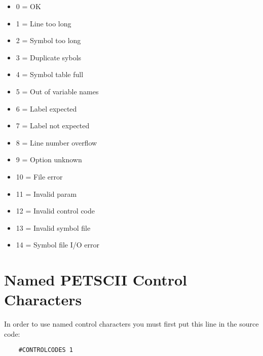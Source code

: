 \documentclass{article}
\begin{document}
        \begin{itemize}
            \item 0 = OK
            \item 1 = Line too long
            \item 2 = Symbol too long
            \item 3 = Duplicate sybols
            \item 4 = Symbol table full
            \item 5 = Out of variable names
            \item 6 = Label expected
            \item 7 = Label not expected
            \item 8 = Line number overflow
            \item 9 = Option unknown
            \item 10 = File error
            \item 11 = Invalid param
            \item 12 = Invalid control code
            \item 13 = Invalid symbol file
            \item 14 = Symbol file I/O error
        \end{itemize}

\appendix
\newpage
\section{Named PETSCII Control Characters}
    
    In order to use named control characters you must first
    put this line in the source code:

    \begin{verbatim}
    #CONTROLCODES 1
    \end{verbatim}
\end{document}
